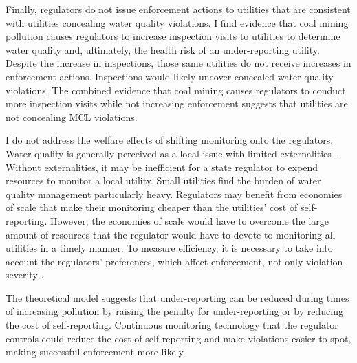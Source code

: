\documentclass[12pt]{article}
\begin{document}
Finally, regulators do not issue enforcement actions to utilities that are consistent with utilities concealing water quality violations. I find evidence that coal mining pollution causes regulators to increase inspection visits to utilities to determine water quality and, ultimately, the health risk of an under-reporting utility. Despite the increase in inspections, those same utilities do not receive increases in enforcement actions. Inspections would likely uncover concealed water quality violations. The combined evidence that coal mining causes regulators to conduct more inspection visits while not increasing enforcement suggests that utilities are not concealing MCL violations. 

I do not address the welfare effects of shifting monitoring onto the regulators. Water quality is generally perceived as a local issue with limited externalities \parencite{olmstead2010economics}. Without externalities, it may be inefficient for a state regulator to expend resources to monitor a local utility. Small utilities find the burden of water quality management particularly heavy. Regulators may benefit from economies of scale that make their monitoring cheaper than the utilities' cost of self-reporting.  However, the economies of scale would have to overcome the large amount of resources that the regulator would have to devote to monitoring all utilities in a timely manner. To measure efficiency, it is necessary to take into account the regulators' preferences, which affect enforcement, not only violation severity \parencite{kang2021understanding}.

The theoretical model suggests that under-reporting can be reduced during times of increasing pollution by raising the penalty for under-reporting or by reducing the cost of self-reporting. Continuous monitoring technology that the regulator controls could reduce the cost of self-reporting and make violations easier to spot, making successful enforcement more likely.

\end{document}
